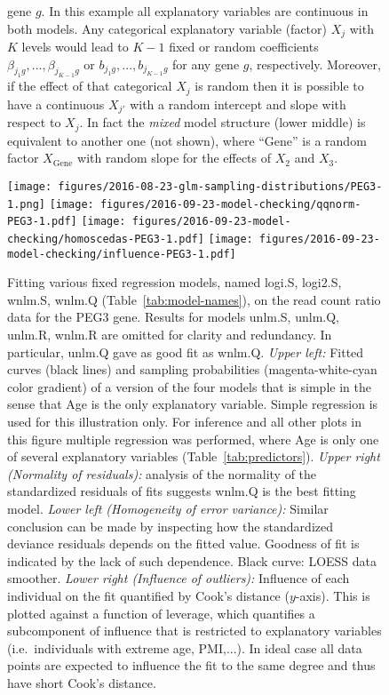 \documentclass[letterpaper]{article}
\begin{document}
\begin{figure}[H]
{gene \(g\).  In this example all explanatory variables are continuous in both
models.  Any categorical explanatory variable (factor) \(X_j\) with \(K\)
levels would lead to \(K - 1\) fixed or random coefficients
\(\beta_{j_1g},...,\beta_{j_{K-1}g}\) or \(b_{j_1g},...,b_{j_{K-1}g}\) for any
gene \(g\), respectively.  Moreover, if the effect of that categorical \(X_j\)
is random then it is possible to have a continuous \(X_{j'}\) with a random
intercept and slope with respect to \(X_j\).  In fact the \emph{mixed} model structure
(lower middle) is equivalent to another one (not shown), where ``Gene'' is a
random factor \(X_\mathrm{Gene}\) with random slope for the effects of \(X_2\)
and \(X_3\).  }
\label{fig:glm-vs-hierarch}
\end{figure}

\begin{figure}[H]
\begin{center}
\texttt{[image: figures/2016-08-23-glm-sampling-distributions/PEG3-1.png]}
\texttt{[image: figures/2016-09-23-model-checking/qqnorm-PEG3-1.pdf]}
\texttt{[image: figures/2016-09-23-model-checking/homoscedas-PEG3-1.pdf]}
\texttt{[image: figures/2016-09-23-model-checking/influence-PEG3-1.pdf]}
\end{center}
\caption{
Fitting various fixed regression models, named logi.S, logi2.S, wnlm.S,
wnlm.Q (Table~\ref{tab:model-names}), on the read count ratio data for the
PEG3 gene.  Results for models unlm.S, unlm.Q, unlm.R, wnlm.R are omitted for
clarity and redundancy.  In particular, unlm.Q gave as good fit as wnlm.Q.
\emph{Upper left:}
Fitted curves (black lines) and sampling probabilities (magenta-white-cyan
color gradient) of a version of the four models that is simple in the sense
that Age is the
only explanatory variable.  Simple regression is used for this illustration
only.  For inference and all other plots in this figure multiple regression
was performed, where Age is only one of several explanatory variables (Table~\ref{tab:predictors}).
\emph{Upper right (Normality of residuals):} analysis of the normality of the standardized residuals of
fits suggests wnlm.Q is the best fitting model.
\emph{Lower left (Homogeneity of error variance):} Similar conclusion can be made by inspecting how the
standardized deviance residuals depends on the fitted value.  Goodness of fit
is indicated by the lack of such dependence.  Black curve: LOESS data smoother.
\emph{Lower right (Influence of outliers):} Influence of each individual on
the fit quantified by Cook's
distance (\(y\)-axis).  This is plotted against a function of leverage, which
quantifies a subcomponent of influence that is restricted to explanatory
variables (i.e.~individuals with extreme age, PMI,...). In ideal case all data points
are expected to influence the fit to the same degree and thus have short
Cook's distance.
}
\label{fig:fitting-fixed-PEG3}
\end{figure}
\end{document}

